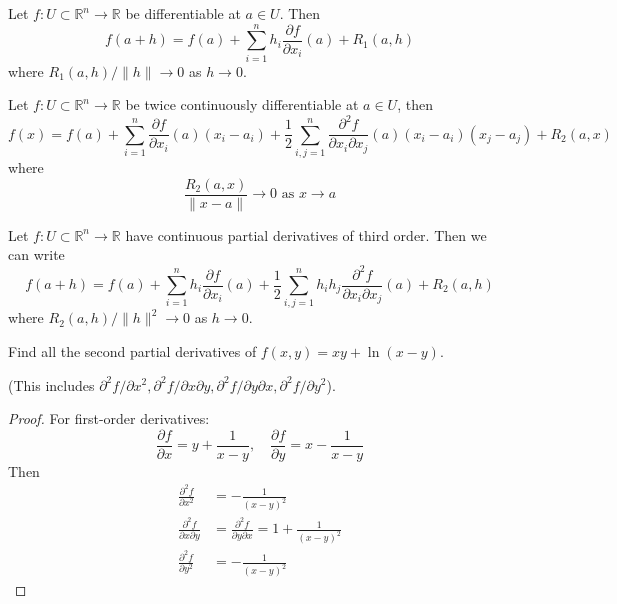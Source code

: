 \documentclass[openany]{book}
\newcommand{\R}{\mathbb{R}}
\begin{document}
\begin{defn}
    Let $f:U\subset\R^n\to\R$ be differentiable at $a\in U$. Then 
    \begin{equation*}
        f(a+h)=f(a)+\sum_{i=1}^nh_i\frac{\partial f}{\partial x_i}(a)+R_1(a,h)
    \end{equation*}
    where $R_1(a,h)/\|h\|\to 0$ as $h\to 0$.
\end{defn}



\begin{defn}\label{taylor}
    Let $f:U\subset\R^n\to\R$ be twice continuously differentiable at $a\in U$, then 
    \begin{equation*}
        f(x)=f(a)+\sum_{i=1}^n\frac{\partial f}{\partial x_i}(a)(x_i-a_i)+\frac{1}{2}\sum_{i,j=1}^n\frac{\partial^2 f}{\partial x_i\partial x_j}(a)(x_i-a_i)(x_j-a_j)+R_2(a,x)
    \end{equation*}
    where 
    \begin{equation*}
        \frac{R_2(a,x)}{\|x-a\|}\to 0 \text{ as } x\to a
    \end{equation*}
\end{defn}


\begin{defn}
    Let $f:U\subset\R^n\to\R$ have continuous partial derivatives of third order. Then we can write 
    \begin{equation*}
        f(a+h)=f(a)+\sum_{i=1}^nh_i\frac{\partial f}{\partial x_i}(a)+\frac{1}{2}\sum_{i,j=1}^nh_ih_j\frac{\partial^2f}{\partial x_i\partial x_j}(a)+R_2(a,h)
    \end{equation*}
    where $R_2(a,h)/\|h\|^2\to 0$ as $h\to 0$.
\end{defn}










\begin{prob}
    Find all the second partial derivatives of $f(x,y)=xy+\ln(x-y)$.

    \noindent
    (This includes $\partial^2f/\partial x^2, \partial^2 f/\partial x\partial y, \partial^2f/\partial y\partial x, \partial^2 f/\partial y^2$).
\end{prob}
\begin{proof}
    For first-order derivatives:
    \begin{equation*}
        \frac{\partial f}{\partial x}=y+\frac{1}{x-y}, \quad \frac{\partial f}{\partial y}=x-\frac{1}{x-y}
    \end{equation*}
    Then 
    \begin{align*}
        \frac{\partial^2f}{\partial x^2}&=-\frac{1}{(x-y)^2}\\
        \frac{\partial^2 f}{\partial x\partial y}&=\frac{\partial^2 f}{\partial y\partial x}=1+\frac{1}{(x-y)^2}\\
        \frac{\partial^2f}{\partial y^2}&=-\frac{1}{(x-y)^2}
    \end{align*}
\end{proof}
\end{document}
